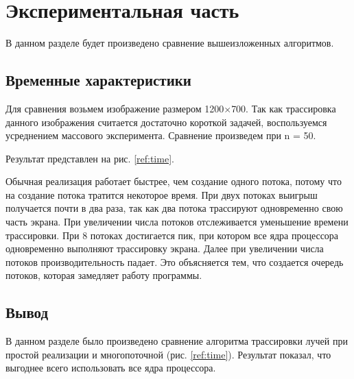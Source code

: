 \chapter{Экспериментальная часть}

В данном разделе будет произведено сравнение вышеизложенных алгоритмов.

\section{Временные характеристики}

Для сравнения возьмем изображение размером 1200$\times$700.
Так как трассировка данного изображения считается достаточно короткой
задачей, воспользуемся усреднением массового эксперимента.
Сравнение произведем при n = 50.

Результат представлен на рис.  \ref{ref:time}.

\begin{figure}[ht!]
\end{figure}


Обычная реализация работает быстрее, чем создание одного потока,
потому что на создание потока тратится некоторое время.
При двух потоках выигрыш получается почти в два раза, так как два потока
трассируют одновременно свою часть экрана.
При увеличении числа потоков отслеживается уменьшение времени трассировки.
При 8 потоках достигается пик, при котором все ядра процессора одновременно
выполняют трассировку экрана.
Далее при увеличении числа потоков производительность падает.
Это объясняется тем, что создается очередь потоков, которая замедляет
работу программы.

\section{Вывод}

В данном разделе было произведено сравнение алгоритма трассировки лучей
при простой реализации и многопоточной (рис. \ref{ref:time}). Результат показал, что
выгоднее всего использовать все ядра процессора.